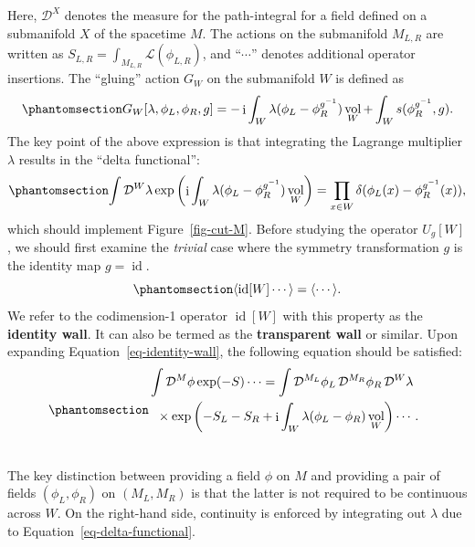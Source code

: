 \documentclass[
  letterpaper,
  DIV=11,
  numbers=noendperiod]{scrreport}
\DeclareMathOperator{\vol}{vol}
\DeclareMathOperator{\imunit}{i}
\DeclareMathOperator{\id}{id}
\begin{document}
Here, \(\mathcal{D}^{X}\) denotes the measure for the path-integral for
a field defined on a submanifold \(X\) of the spacetime \(M\). The
actions on the submanifold \(M_{L,R}\) are written as
\(S_{L,R} = \int_{M_{L,R}}\mathcal{L}(\phi_{L,R})\), and ``\(\cdots\)''
denotes additional operator insertions. The ``gluing'' action \(G_W\) on
the submanifold \(W\) is defined as
\begin{equation}\phantomsection\label{eq-gluing-action}{
    G_W[\lambda,\phi_L,\phi_R,g] = - \imunit \int_W \lambda(\phi_L - \phi_R^{g^{-1}})\vol_W+\int_W s(\phi_R^{g^{-1}},g).
}\end{equation} The key point of the above expression is that
integrating the Lagrange multiplier \(\lambda\) results in the ``delta
functional'':
\begin{equation}\phantomsection\label{eq-delta-functional}{
    \int \mathop{\mathcal{D}^W\lambda} \exp\left(\imunit \int_W \lambda (\phi_L-\phi^{g^{-1}}_R)\vol_W\right)
     = \prod_{x\in W}\delta(\phi_L(x) - \phi_R^{g^{-1}}(x)),
}\end{equation} which should implement Figure~\ref{fig-cut-M}. Before
studying the operator \(U_g[W]\), we should first examine the
\emph{trivial} case where the symmetry transformation \(g\) is the
identity map \(g=\id\).
\begin{equation}\phantomsection\label{eq-identity-wall}{
\langle \id[W] \cdots \rangle = \langle \cdots \rangle.
}\end{equation} We refer to the codimension-1 operator \(\id[W]\) with
this property as the \textbf{identity wall}. It can also be termed as
the \textbf{transparent wall} or similar. Upon expanding
Equation~\ref{eq-identity-wall}, the following equation should be
satisfied: \begin{equation}\phantomsection\label{eq-trivial-scalar}{
\begin{multlined}
    \int \mathop{\mathcal{D}^M\phi} \exp(-S) \cdots=
    \int \mathop{\mathcal{D}^{M_L}\phi_L} \mathop{\mathcal{D}^{M_R}\phi_R} \mathop{\mathcal{D}^W\lambda} \\ \times \exp\left(-S_L-S_R+\imunit \int_W \lambda(\phi_L - \phi_R)\vol_W\right)\cdots.\\ 
\end{multlined}
}\end{equation}

The key distinction between providing a field \(\phi\) on \(M\) and
providing a pair of fields \((\phi_L,\phi_R)\) on \((M_L,M_R)\) is that
the latter is not required to be continuous across \(W\). On the
right-hand side, continuity is enforced by integrating out \(\lambda\)
due to Equation~\ref{eq-delta-functional}.
\end{document}
